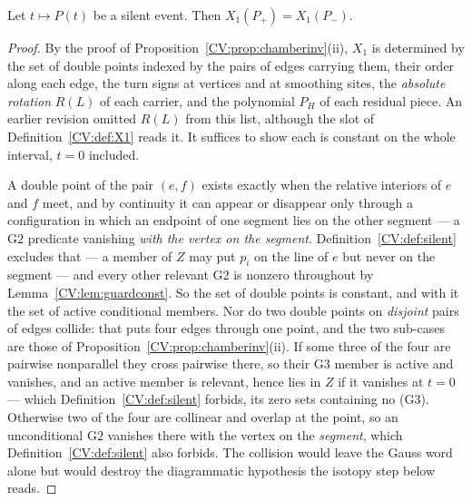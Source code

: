 \begin{lemma}\label{CV:lem:silence}\leanok
Let $t\mapsto P(t)$ be a silent event. Then $X_1(P_+)=X_1(P_-)$.
\end{lemma}
\begin{proof}\leanok{}
By the proof of Proposition~\ref{CV:prop:chamberinv}(ii), $X_1$ is determined by the
set of double points indexed by the pairs of edges carrying them, their order
along each edge, the turn signs at vertices and at smoothing sites, the
\emph{absolute rotation} $R(L)$ of each carrier, and the polynomial $P_H$ of each
residual piece. An earlier revision omitted $R(L)$ from this list,
although the slot of Definition~\ref{CV:def:X1} reads it. It suffices to show each is
constant on the whole interval, $t=0$ included.

A double point of the pair $(e,f)$ exists exactly when the relative interiors of
$e$ and $f$ meet, and by continuity it can appear or disappear only through a
configuration in which an endpoint of one segment lies on the other segment ---
a $\mathrm{G2}$ predicate vanishing \emph{with the vertex on the segment}.
Definition~\ref{CV:def:silent} excludes that --- a member of $Z$ may put $p_i$ on
the line of $e$ but never on the segment --- and every other relevant
$\mathrm{G2}$ is nonzero throughout by Lemma~\ref{CV:lem:guardconst}.
So the set of double points is constant, and with it the set of active
conditional members. Nor do two double points on \emph{disjoint} pairs of edges collide: that puts
four edges through one point, and the two sub-cases are those of
Proposition~\ref{CV:prop:chamberinv}(ii). If some three of the four are pairwise
nonparallel they cross pairwise there, so their $\mathrm{G3}$ member is active
and vanishes, and an active member is relevant, hence lies in $Z$ if it
vanishes at $t=0$ --- which Definition~\ref{CV:def:silent} forbids, its zero sets
containing no (G3). Otherwise two of the four are collinear and overlap at the
point, so an unconditional $\mathrm{G2}$ vanishes there with the vertex on the
\emph{segment}, which Definition~\ref{CV:def:silent} also forbids.
The collision would leave the Gauss word alone but would destroy the
diagrammatic hypothesis the isotopy step below reads.


\end{proof}

